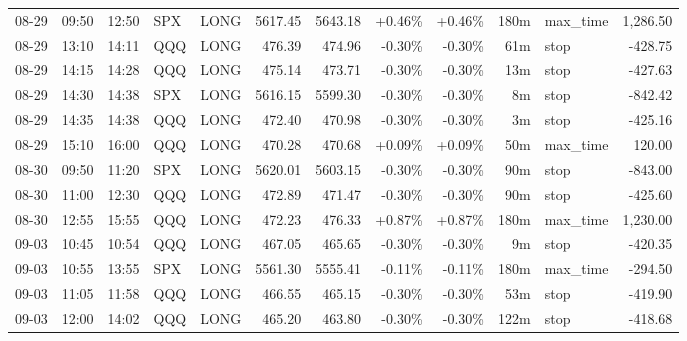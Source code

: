 \documentclass[11pt,a4paper,twoside]{article}
\begin{document}
\begin{center}
\begin{longtable}{>{\color{txtmain}}l l l l l r r r r r >{\color{txtmain}}l r}
08-29 & 09:50 & 12:50 & SPX & LONG & 5617.45 & 5643.18 & \textcolor{wingreen}{+0.46\%} & \textcolor{wingreen}{+0.46\%} & 180m & max\_time & \textcolor{wingreen}{1,286.50} \\
08-29 & 13:10 & 14:11 & QQQ & LONG & 476.39 & 474.96 & \textcolor{lossred}{-0.30\%} & \textcolor{lossred}{-0.30\%} & 61m & stop & \textcolor{lossred}{-428.75} \\
08-29 & 14:15 & 14:28 & QQQ & LONG & 475.14 & 473.71 & \textcolor{lossred}{-0.30\%} & \textcolor{lossred}{-0.30\%} & 13m & stop & \textcolor{lossred}{-427.63} \\
08-29 & 14:30 & 14:38 & SPX & LONG & 5616.15 & 5599.30 & \textcolor{lossred}{-0.30\%} & \textcolor{lossred}{-0.30\%} & 8m & stop & \textcolor{lossred}{-842.42} \\
08-29 & 14:35 & 14:38 & QQQ & LONG & 472.40 & 470.98 & \textcolor{lossred}{-0.30\%} & \textcolor{lossred}{-0.30\%} & 3m & stop & \textcolor{lossred}{-425.16} \\
08-29 & 15:10 & 16:00 & QQQ & LONG & 470.28 & 470.68 & \textcolor{wingreen}{+0.09\%} & \textcolor{wingreen}{+0.09\%} & 50m & max\_time & \textcolor{wingreen}{120.00} \\
08-30 & 09:50 & 11:20 & SPX & LONG & 5620.01 & 5603.15 & \textcolor{lossred}{-0.30\%} & \textcolor{lossred}{-0.30\%} & 90m & stop & \textcolor{lossred}{-843.00} \\
08-30 & 11:00 & 12:30 & QQQ & LONG & 472.89 & 471.47 & \textcolor{lossred}{-0.30\%} & \textcolor{lossred}{-0.30\%} & 90m & stop & \textcolor{lossred}{-425.60} \\
08-30 & 12:55 & 15:55 & QQQ & LONG & 472.23 & 476.33 & \textcolor{wingreen}{+0.87\%} & \textcolor{wingreen}{+0.87\%} & 180m & max\_time & \textcolor{wingreen}{1,230.00} \\
09-03 & 10:45 & 10:54 & QQQ & LONG & 467.05 & 465.65 & \textcolor{lossred}{-0.30\%} & \textcolor{lossred}{-0.30\%} & 9m & stop & \textcolor{lossred}{-420.35} \\
09-03 & 10:55 & 13:55 & SPX & LONG & 5561.30 & 5555.41 & \textcolor{lossred}{-0.11\%} & \textcolor{lossred}{-0.11\%} & 180m & max\_time & \textcolor{lossred}{-294.50} \\
09-03 & 11:05 & 11:58 & QQQ & LONG & 466.55 & 465.15 & \textcolor{lossred}{-0.30\%} & \textcolor{lossred}{-0.30\%} & 53m & stop & \textcolor{lossred}{-419.90} \\
09-03 & 12:00 & 14:02 & QQQ & LONG & 465.20 & 463.80 & \textcolor{lossred}{-0.30\%} & \textcolor{lossred}{-0.30\%} & 122m & stop & \textcolor{lossred}{-418.68} \\

\end{longtable}
\end{center}
\end{document}
